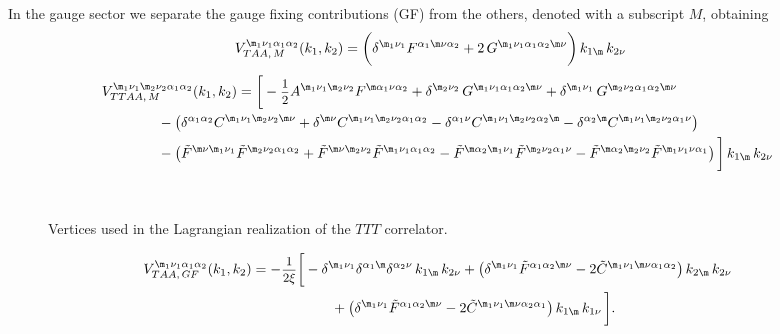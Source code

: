 \documentclass[a4paper,11pt,openright,twoside]{book}
\let\a=\alpha   \let\b=\beta   \let\g=\gamma   \let\d=\delta
\let\n=\nu      \let\x=\xi     \let\p=\pi      \let\r=\rho
\newcommand{\sdfrac}[2]{\mbox{\small$\displaystyle\frac{#1}{#2}$}}
\numberwithin{equation}{section}
\begin{document}
{{In the gauge sector we separate the gauge fixing contributions (GF) from the others, denoted with a subscript $M$, obtaining 
\begin{align}
	V^{\m_1\n_1\a_1\a_2}_{TAA,\,M}(k_1,k_2)&=\bigg(\d^{\m_1\n_1}F^{\a_1\m\n\a_2}+2\,G^{\m_1\n_1\a_1\a_2\m\n}\bigg)\,k_{1\m}\,k_{2\n}
\end{align}
\begin{align}
	V^{\m_1\n_1\m_2\n_2\a_1\a_2}_{TTAA,\,M}(k_1,k_2)&=\bigg[-\sdfrac{1}{2}A^{\m_1\n_1\m_2\n_2}F^{\m\a_1\n\a_2}+\d^{\m_2\n_2}\,G^{\m_1\n_1\a_1\a_2\m\n}+\d^{\m_1\n_1}\,G^{\m_2\n_2\a_1\a_2\m\n}\notag\\
	&\hspace{-2cm}-\big(\d^{\a_1\a_2}C^{\m_1\n_1\m_2\n_2\m\n}+\d^{\m\n}C^{\m_1\n_1\m_2\n_2\a_1\a_2}-\d^{\a_1\n}C^{\m_1\n_1\m_2\n_2\a_2\m}-\d^{\a_2\m}C^{\m_1\n_1\m_2\n_2\a_1\n}\big)\notag\\
	&\hspace{-2cm}-\big(\tilde{F}^{\m\n\m_1\n_1}\tilde{F}^{\m_2\n_2\a_1\a_2}+\tilde{F}^{\m\n\m_2\n_2}\tilde{F}^{\m_1\n_1\a_1\a_2}-\tilde{F}^{\m\a_2\m_1\n_1}\tilde{F}^{\m_2\n_2\a_1\n}-\tilde{F}^{\m\a_2\m_2\n_2}\tilde{F}^{\m_1\n_1\n\a_1}\big)\,\bigg]\,k_{1\m}\,k_{2\n}
\end{align}
\begin{figure}[t]
	\centering
	\vspace{-0.5cm}
	 \hspace{.3cm}
	 \hspace{.3cm}
	 \hspace{.3cm}
	\\
	\vspace{-1.5cm}
	 \hspace{.3cm}
	 \hspace{.3cm}
	 \hspace{.3cm}
	\caption{Vertices used in the Lagrangian realization of the $TTT$ correlator.\label{vertices}}
\end{figure}
\begin{align}
	V^{\m_1\n_1\a_1\a_2}_{TAA,\,GF}(k_1,k_2)&=-\sdfrac{1}{2\xi}\bigg[-\d^{\m_1\n_1}\d^{\a_1\m}\d^{\a_2\n}\,k_{1\m}\,k_{2\n}+\big(\d^{\m_1\n_1}\tilde{F}^{\a_1\a_2\m\n}-2\tilde{C}^{\m_1\n_1\m\n\a_1\a_2}\big)\,k_{2\m}\,k_{2\n}\notag\\
	&\hspace{2cm}+\big(\d^{\m_1\n_1}\tilde{F}^{\a_1\a_2\m\n}-2\tilde{C}^{\m_1\n_1\m\n\a_2\a_1}\big)\,k_{1\m}\,k_{1\n}\,\bigg].
\end{align}

}}
\end{document}
